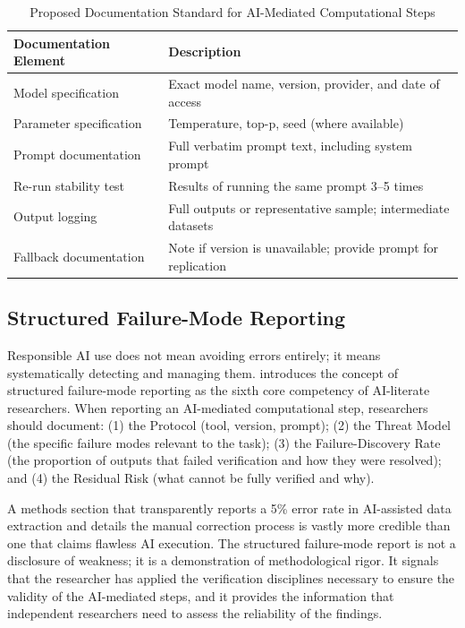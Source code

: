 \documentclass[12pt, a4paper]{article}
\begin{document}
\begin{table}[ht]
\centering
\caption{Proposed Documentation Standard for AI-Mediated Computational Steps}
\label{tab:documentation}
\begin{tabularx}{\textwidth}{lX}
\toprule
\textbf{Documentation Element} & \textbf{Description} \\
\midrule
Model specification & Exact model name, version, provider, and date of access \\
Parameter specification & Temperature, top-p, seed (where available) \\
Prompt documentation & Full verbatim prompt text, including system prompt \\
Re-run stability test & Results of running the same prompt 3--5 times \\
Output logging & Full outputs or representative sample; intermediate datasets \\
Fallback documentation & Note if version is unavailable; provide prompt for replication \\
\bottomrule
\end{tabularx}
\end{table}

\subsection{Structured Failure-Mode Reporting}

Responsible AI use does not mean avoiding errors entirely; it means systematically detecting and managing them. \citet{zyphur2026responsible} introduces the concept of structured failure-mode reporting as the sixth core competency of AI-literate researchers. When reporting an AI-mediated computational step, researchers should document: (1) the Protocol (tool, version, prompt); (2) the Threat Model (the specific failure modes relevant to the task); (3) the Failure-Discovery Rate (the proportion of outputs that failed verification and how they were resolved); and (4) the Residual Risk (what cannot be fully verified and why).

A methods section that transparently reports a 5\% error rate in AI-assisted data extraction and details the manual correction process is vastly more credible than one that claims flawless AI execution. The structured failure-mode report is not a disclosure of weakness; it is a demonstration of methodological rigor. It signals that the researcher has applied the verification disciplines necessary to ensure the validity of the AI-mediated steps, and it provides the information that independent researchers need to assess the reliability of the findings.
\end{document}
